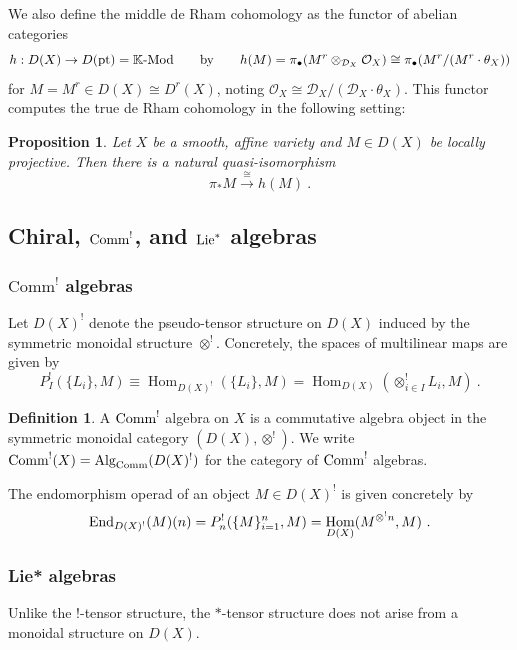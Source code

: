 \documentclass[11pt]{amsart}
\numberwithin{equation}{section}
\newtheorem{prop}[theo]{Proposition}
\theoremstyle{definition}
\newtheorem{defn}[theo]{Definition}
\newcommand{\bb}{\mathbb}
\newcommand{\mc}{\mathcal}
\newcommand{\OEnd}{{\textup{End}}}
\DeclareMathOperator{\Hom}{Hom}
\newcommand{\Mod}{{\textup{-Mod}}}
\newcommand{\K}{{\bb K}}
\newcommand{\Alg}{{\textup{Alg}}}
\newcommand{\Comm}{{\textup{Comm}}}
\newcommand{\Lie}{{\textup{Lie}}}
\newcommand{\pt}{{\textup{pt}}}
\newcommand{\0}{{\textbf{0}}}
\newcommand{\DD}{{D}}
\begin{document}
We also define the middle de Rham cohomology as the functor of abelian categories
\[ h:\DD(X)\to \DD(\pt)=\K\Mod \qquad \text{by}\qquad h(M)=\pi_\bullet(M^r\otimes_{\mc D_X} \mc O_X) \cong \pi_\bullet( M^r/(M^r\cdot \theta_X)) \]
for $M=M^r\in \DD(X)\cong \DD^r(X)$, noting $\mc O_X \cong \mc D_X / (\mc D_X \cdot \theta_X)$. This functor computes the true de Rham cohomology in the following setting:

\begin{prop}\label{locprojaffprop} Let $X$ be a smooth, affine variety and $M\in \DD(X)$ be locally projective. Then there is a natural quasi-isomorphism
\[ \pi_*M \xrightarrow{\cong} h(M) \ . \]
\end{prop}








\subsection{Chiral, \texorpdfstring{$\Comm^!$}{Comm!}, and \texorpdfstring{$\Lie^*$}{Lie*} algebras}\label{ssec:chiral algebras}
\subsubsection{\texorpdfstring{$\text{Comm}^!$}{Comm!} algebras}
Let $\DD(X)^!$ denote the pseudo-tensor structure on $\DD(X)$ induced by the symmetric monoidal structure $\otimes^!$. Concretely, the spaces of multilinear maps are given by
\[
P^!_I(\{L_i\}, M)\equiv\Hom_{\DD(X)^!}(\{L_i\}, M) = \Hom_{\DD(X)}(\otimes^!_{i\in I} L_i , M) \ . 
\]

\begin{defn}
	A $\Comm^!$ algebra on $X$ is a commutative algebra object in the symmetric monoidal category $(\DD(X),\otimes^!)$. We write $\Comm^!(X)=\Alg_{\Comm}(\DD(X)^!)$ for the category of $\Comm^!$ algebras.
\end{defn}

The endomorphism operad of an object $M\in \DD(X)^!$ is given concretely by
\[ \OEnd_{\DD(X)^!}(M)(n)=P^!_n(\{M\}_{i=1}^n, M) = \Hom_{\DD(X)}(M^{\otimes^! n} , M) \ .  \]




\subsubsection{Lie* algebras}

Unlike the $!$-tensor structure, the $*$-tensor structure does not arise from a monoidal structure on $\DD(X)$.
\end{document}
